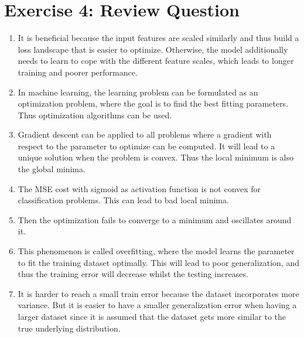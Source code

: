 \documentclass[onecolumn]{article}
\begin{document}
\section{Exercise 4: Review Question}
\begin{enumerate}[label=(\alph*)]
	\item It is beneficial because the input features are scaled similarly and thus build a loss landscape that is easier to optimize. Otherwise, the model additionally needs to learn to cope with the different feature scales, which leads to longer training and poorer performance.
	\item In machine learning, the learning problem can be formulated as an optimization problem, where the goal is to find the best fitting parameters. Thus optimization algorithms can be used.
	\item Gradient descent can be applied to all problems where a gradient with respect to the parameter to optimize can be computed. It will lead to a unique solution when the problem is convex. Thus the local minimum is also the global minima.
	\item The MSE cost with sigmoid as activation function is not convex for classification problems. This can lead to bad local minima.
	\item Then the optimization fails to converge to a minimum and oscillates around it.
	\item This phenomenon is called overfitting, where the model learns the parameter to fit the training dataset optimally. This will lead to poor generalization, and thus the training error will decrease whilst the testing increases.
	\item It is harder to reach a small train error because the dataset incorporates more variance. But it is easier to have a smaller generalization error when having a larger dataset since it is assumed that the dataset gets more similar to the true underlying distribution.
\end{enumerate}
\end{document}
